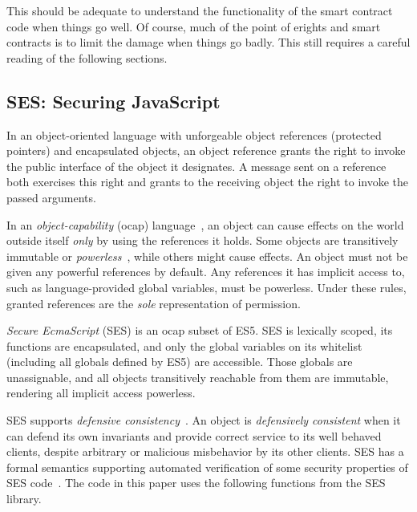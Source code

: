 \documentclass{llncs}
\begin{document}
This should be adequate to understand the functionality of the smart contract code when things go well. Of course, much of the point of erights and smart contracts is to limit the damage when things go badly. This still requires a careful reading of the following sections.
 

\subsection{SES: Securing JavaScript}
\label{ses}

In an object-oriented language with unforgeable object references (protected pointers) and encapsulated objects, an object reference grants the right to invoke the public interface of the object it designates. A message sent on a reference both exercises this right and grants to the receiving object the right to invoke the passed arguments. 

In an \emph{object-capability} (ocap) language~\cite{RobustComposition}, an object can cause effects on the world outside itself \emph{only} by using the references it holds. Some objects are transitively immutable or \emph{powerless}~\cite{Mettler:EECS-2012-244}, while others might cause effects. An object must not be given any powerful references by default. Any references it has implicit access to, such as language-provided global variables, must be powerless. Under these rules, granted references are the \emph{sole} representation of permission.

\emph{Secure EcmaScript} (SES) is an ocap subset of ES5. SES is lexically scoped, its functions are encapsulated, and only the global variables on its whitelist (including all globals defined by ES5) are accessible. Those globals  are unassignable, and all objects transitively reachable from them are immutable, rendering all implicit access powerless. 

SES supports \emph{defensive consistency}~\cite{RobustComposition}. An object is \emph{defensively consistent} when it can defend its own invariants and provide correct service to its well behaved clients, despite arbitrary or malicious misbehavior by its other clients. SES has a formal semantics supporting automated verification of some security properties of SES code~\cite{taly2011automated}. The code in this paper uses the following functions from the SES library.
\end{document}
